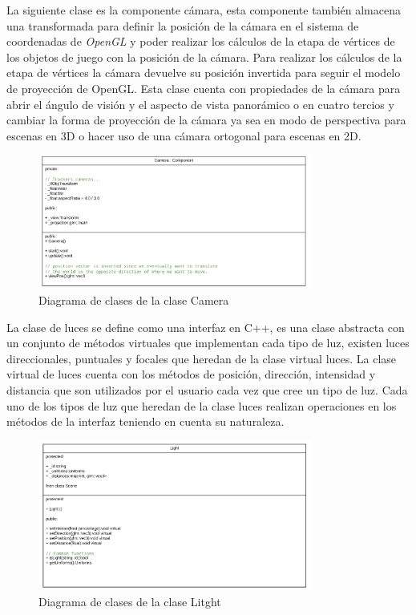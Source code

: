 \documentclass[a4paper]{book}
\begin{document}
La siguiente clase es la componente cámara, esta componente también almacena una transformada para definir la posición de la cámara en el
sistema de coordenadas de \textit{OpenGL} y poder realizar los cálculos de la etapa de vértices de los objetos de juego con la posición de la cámara.
Para realizar los cálculos de la etapa de vértices la cámara devuelve su posición invertida para seguir el modelo de proyección de OpenGL. Esta
clase cuenta con propiedades de la cámara para abrir el ángulo de visión y el aspecto de vista panorámico o en cuatro tercios y cambiar
la forma de proyección de la cámara ya sea en modo de perspectiva para escenas en 3D o hacer uso de una cámara ortogonal para
escenas en 2D.

\begin{figure}[H]
    \centering
    \includegraphics[width=9cm, keepaspectratio]{img/Camera.png}
    \caption{Diagrama de clases de la clase Camera}
    \label{Camera}
\end{figure}

La clase de luces se define como una interfaz en C++, es una clase abstracta con un conjunto de métodos virtuales que implementan cada
tipo de luz, existen luces direccionales, puntuales y focales que heredan de la clase virtual luces. La clase virtual de luces cuenta con
los métodos de posición, dirección, intensidad y distancia que son utilizados por el usuario cada vez que cree un tipo de luz. Cada uno de los
tipos de luz que heredan de la clase luces realizan operaciones en los métodos de la interfaz teniendo en cuenta su naturaleza.

\begin{figure}[H]
    \centering
    \includegraphics[width=9cm, keepaspectratio]{img/Litght.png}
    \caption{Diagrama de clases de la clase Litght}
    \label{Litght}
\end{figure}
\end{document}
